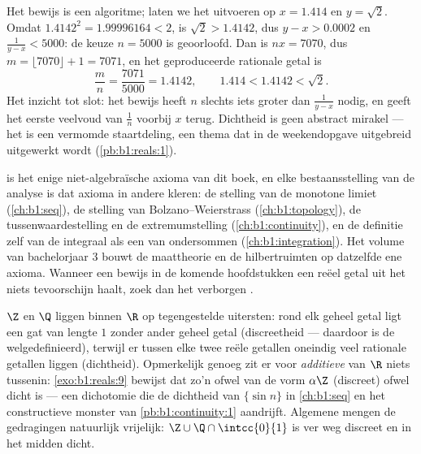 \begin{example}\label{ex:b1:reals:densityrun}
Het bewijs is een algoritme; laten we het uitvoeren op $x = 1.414$ en $y
= \sqrt 2$. Omdat $1.4142^2 = 1.99996164 < 2$, is $\sqrt 2 > 1.4142$,
dus $y - x > 0.0002$ en $\frac{1}{y - x} < 5000$: de keuze $n = 5000$ is
geoorloofd. Dan is $nx = 7070$, dus $m = \lfloor 7070 \rfloor + 1 =
7071$, en het geproduceerde rationale getal is
\[
\frac{m}{n} = \frac{7071}{5000} = 1.4142,
\qquad
1.414 < 1.4142 < \sqrt 2 .
\]
Het inzicht tot slot: het bewijs heeft $n$ slechts iets groter dan
$\frac{1}{y-x}$ nodig, en geeft het eerste veelvoud van $\frac 1n$
voorbij $x$ terug. Dichtheid is geen abstract mirakel --- het is een
vermomde staartdeling, een thema dat in de weekendopgave uitgebreid
uitgewerkt wordt (\cref{pb:b1:reals:1}).
\end{example}

\begin{remark}
 is het enige niet-algebraïsche axioma van dit
boek, en elke bestaansstelling van de analyse is dat axioma in andere
kleren: de stelling van de monotone limiet (\cref{ch:b1:seq}), de
stelling van Bolzano--Weierstrass (\cref{ch:b1:topology}), de
tussenwaardestelling en de extremumstelling
(\cref{ch:b1:continuity}), en de definitie zelf van de integraal als een
 van ondersommen (\cref{ch:b1:integration}). Het volume van
bachelorjaar 3 bouwt de maattheorie en de hilbertruimten op datzelfde ene
axioma. Wanneer een bewijs in de komende hoofdstukken een reëel getal uit
het niets tevoorschijn haalt, zoek dan het verborgen .
\end{remark}

\begin{remark}
$\Z$ en $\Q$ liggen binnen $\R$ op tegengestelde uitersten: rond elk
geheel getal ligt een gat van lengte $1$ zonder ander geheel getal
(discreetheid --- daardoor is de  welgedefinieerd), terwijl er
tussen elke twee reële getallen oneindig veel rationale getallen liggen
(dichtheid). Opmerkelijk genoeg zit er voor \emph{additieve }
van $\R$ niets tussenin: \cref{exo:b1:reals:9} bewijst dat zo'n 
ofwel van de vorm $\alpha\Z$ (discreet) ofwel dicht is --- een dichotomie
die de dichtheid van $\{\sin n\}$ in \cref{ch:b1:seq} en het
constructieve monster van \cref{pb:b1:continuity:1} aandrijft. Algemene
 mengen de gedragingen natuurlijk vrijelijk: $\Z \cup
\Q\cap\intcc{0}{1}$ is ver weg discreet en in het midden dicht.
\end{remark}

